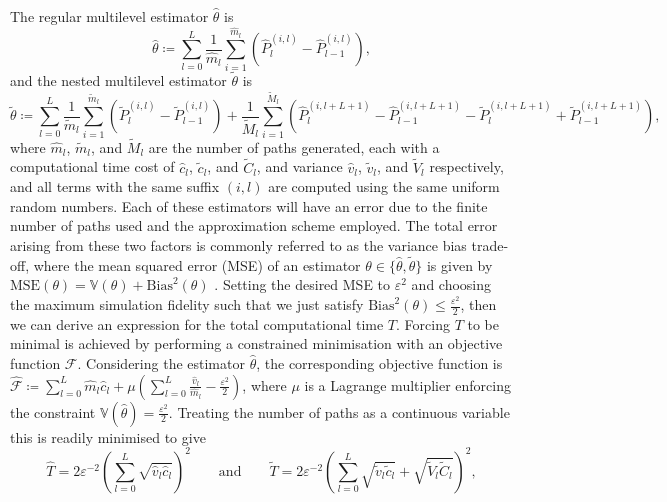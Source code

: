 \documentclass[manuscript,review]{acmart}
\begin{document}
The regular multilevel estimator $ \hat{\theta} $ is
\begin{equation*}
  \hat{\theta}  \coloneqq \sum_{l=0}^{L} \dfrac{1}{\widehat{m}_l} \sum_{i=1}^{\widehat{m}_l} \left( \widehat{P}^{(i,l)}_l - \widehat{P}^{(i,l)}_{l-1}\right),
\end{equation*}
and the nested multilevel estimator $ \tilde{\theta} $ is
\begin{equation*}
\tilde{\theta} \coloneqq \sum_{l=0}^L \dfrac{1}{\widetilde{m}_l} \sum_{i=1}^{\widetilde{m}_l}\left( \widetilde{P}^{(i,l)}_l - \widetilde{P}^{(i,l)}_{l-1}\right) + \dfrac{1}{\widetilde{M}_l} \sum_{i=1}^{\widetilde{M}_l} \left( \widehat{P}^{(i,l+L+1)}_l - \widehat{P}^{(i,l+L+1)}_{l-1} - \widetilde{P}^{(i,l+L+1)}_l + \widetilde{P}^{(i,l+L+1)}_{l-1}\right),
\end{equation*}
where $ \widehat{m}_l $, $ \widetilde{m}_l $, and $ \widetilde{M}_l $ are the number of paths generated, each with a computational time cost of $ \hat{c}_l $, $ \tilde{c}_l $, and $ \widetilde{C}_l $, and variance $ \hat{v}_l $, $ \tilde{v}_l $, and $ \widetilde{V}_l $ respectively, and all terms with the same suffix $(i,l)$ are computed using the same uniform random numbers. Each of these estimators will have an error due to the finite number of paths used and the approximation scheme employed. The total error arising from these two factors is commonly referred to as the variance bias trade-off, where the mean squared error (MSE) of an estimator $ \theta \in \{\hat{\theta}, \tilde{\theta}\} $ is given by $ \text{MSE}(\theta) = \mathbb{V}(\theta) + \text{Bias}^2(\theta)$ \citep[page~16]{glasserman2013monte}. Setting the desired MSE to $ \varepsilon^2 $ and choosing the maximum simulation fidelity such that we just satisfy $ \text{Bias}^2(\theta) \leq \tfrac{\varepsilon^2}{2} $, then we can derive an expression for the total computational time $ T $. Forcing $ T $ to be minimal is achieved by performing a constrained minimisation with an objective function $ \mathscr{F} $. Considering the estimator $ \hat{\theta} $, the corresponding objective function is $ \widehat{\mathscr{F}} \coloneqq \sum_{l=0}^{L} \widehat{m}_l \hat{c}_l + \mu (\sum_{l=0}^{L} \tfrac{\hat{v}_l}{\widehat{m}_l} - \tfrac{\varepsilon^2}{2}) $, where $ \mu $ is a Lagrange multiplier enforcing the constraint $ \mathbb{V}(\hat{\theta}) = \tfrac{\varepsilon^2}{2} $. Treating the number of paths as a continuous variable this is readily minimised to give
\begin{equation*}
\widehat{T} = 2\varepsilon^{-2}\left(\sum_{l=0}^L \sqrt{\hat{v}_l \hat{c}_l}\right)^2 
\qquad \text{and} \qquad 
\widetilde{T} = 2\varepsilon^{-2} \left(\sum_{l=0}^L \sqrt{\tilde{v}_l \tilde{c}_l} + \sqrt{\widetilde{V}_l \widetilde{C}_l}\right)^2,
\end{equation*}
\end{document}
